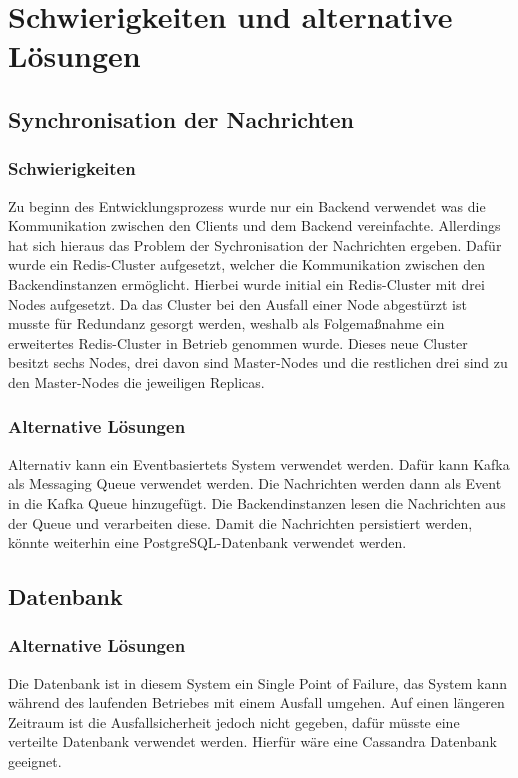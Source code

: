 \chapter{Schwierigkeiten und alternative Lösungen}

\section{Synchronisation der Nachrichten}
\subsection{Schwierigkeiten}
Zu beginn des Entwicklungsprozess wurde nur ein Backend verwendet was die Kommunikation zwischen den Clients und dem Backend vereinfachte.
Allerdings hat sich hieraus das Problem der Sychronisation der Nachrichten ergeben.
Dafür wurde ein Redis-Cluster aufgesetzt, welcher die Kommunikation zwischen den Backendinstanzen ermöglicht.
Hierbei wurde initial ein Redis-Cluster mit drei Nodes aufgesetzt.
Da das Cluster bei den Ausfall einer Node abgestürzt ist musste für Redundanz gesorgt werden, weshalb als Folgemaßnahme ein erweitertes Redis-Cluster in Betrieb genommen wurde.
Dieses neue Cluster besitzt sechs Nodes, drei davon sind Master-Nodes und die restlichen drei sind zu den Master-Nodes die jeweiligen Replicas.

\subsection{Alternative Lösungen}
Alternativ kann ein Eventbasiertets System verwendet werden.
Dafür kann Kafka als Messaging Queue verwendet werden.
Die Nachrichten werden dann als Event in die Kafka Queue hinzugefügt.
Die Backendinstanzen lesen die Nachrichten aus der Queue und verarbeiten diese.
Damit die Nachrichten persistiert werden, könnte weiterhin eine PostgreSQL-Datenbank verwendet werden.


\section{Datenbank}

\subsection{Alternative Lösungen}
Die Datenbank ist in diesem System ein Single Point of Failure, das System kann während des laufenden Betriebes mit einem Ausfall umgehen.
Auf einen längeren Zeitraum ist die Ausfallsicherheit jedoch nicht gegeben, dafür müsste eine verteilte Datenbank verwendet werden. 
Hierfür wäre eine Cassandra Datenbank geeignet.
